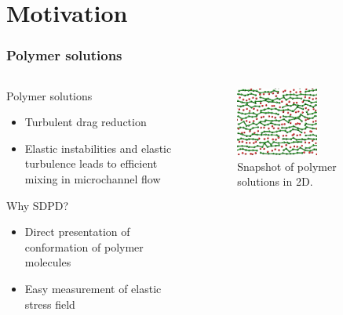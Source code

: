 \section[Motivation]{Motivation}
\begin{frame}
  \frametitle{Polymer solutions}
  \begin{columns}
    \begin{column}{0.5\textwidth}
      \begin{block}{Polymer solutions}
        \begin{itemize}
        \item Turbulent drag reduction
        \item Elastic instabilities and elastic turbulence leads to efficient mixing in microchannel flow
        \end{itemize}
      \end{block}
      \begin{block}{Why SDPD?}
        \begin{itemize} 
        \item Direct presentation of conformation of polymer molecules
        \item Easy measurement of elastic stress field
        \end{itemize}
      \end{block}
    \end{column}
    \begin{column}{0.5\textwidth}
      \begin{figure}[t]
        \centering
        \includegraphics[width=0.6\textwidth]{img/polymers.png}
        \caption{Snapshot of polymer solutions in 2D.}
        \label{fig:snap}
      \end{figure}
    \end{column}
  \end{columns}
\end{frame}

